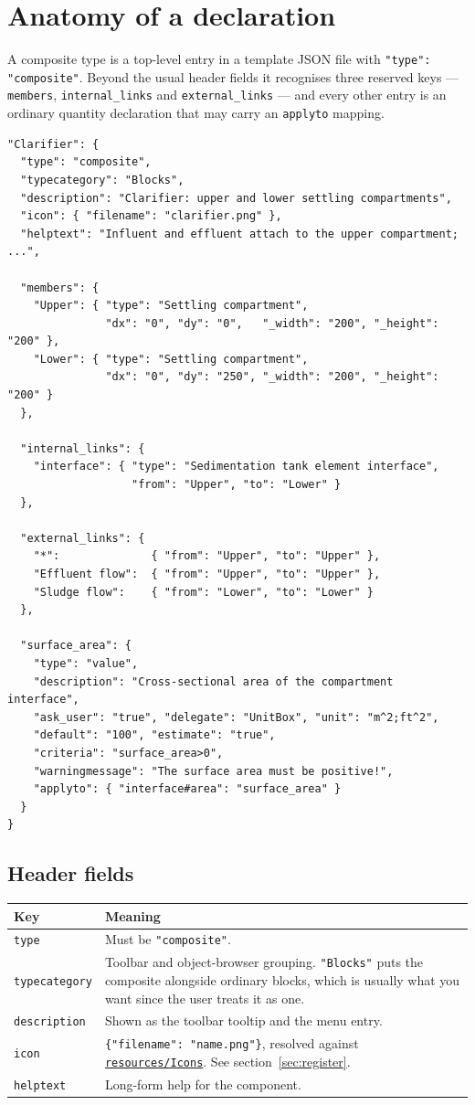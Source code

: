 \documentclass[11pt,a4paper]{article}
\newcommand{\code}[1]{\texttt{\small #1}}
\newcommand{\file}[1]{\texttt{\small #1}}
\newcommand{\ghtree}{https://github.com/ArashMassoudieh/OpenHydroQual/tree/master}
\newcommand{\exdir}[1]{\href{\ghtree/#1}{\file{#1}}}
\begin{document}
\section{Anatomy of a declaration}

A composite type is a top-level entry in a template JSON file with
\code{"type": "composite"}. Beyond the usual header fields it recognises three
reserved keys --- \code{members}, \code{internal\_links} and
\code{external\_links} --- and every other entry is an ordinary quantity
declaration that may carry an \code{applyto} mapping.

\begin{lstlisting}
"Clarifier": {
  "type": "composite",
  "typecategory": "Blocks",
  "description": "Clarifier: upper and lower settling compartments",
  "icon": { "filename": "clarifier.png" },
  "helptext": "Influent and effluent attach to the upper compartment; ...",

  "members": {
    "Upper": { "type": "Settling compartment",
               "dx": "0", "dy": "0",   "_width": "200", "_height": "200" },
    "Lower": { "type": "Settling compartment",
               "dx": "0", "dy": "250", "_width": "200", "_height": "200" }
  },

  "internal_links": {
    "interface": { "type": "Sedimentation tank element interface",
                   "from": "Upper", "to": "Lower" }
  },

  "external_links": {
    "*":              { "from": "Upper", "to": "Upper" },
    "Effluent flow":  { "from": "Upper", "to": "Upper" },
    "Sludge flow":    { "from": "Lower", "to": "Lower" }
  },

  "surface_area": {
    "type": "value",
    "description": "Cross-sectional area of the compartment interface",
    "ask_user": "true", "delegate": "UnitBox", "unit": "m^2;ft^2",
    "default": "100", "estimate": "true",
    "criteria": "surface_area>0",
    "warningmessage": "The surface area must be positive!",
    "applyto": { "interface#area": "surface_area" }
  }
}
\end{lstlisting}

\subsection{Header fields}

\begin{longtable}{@{}p{}p{}@{}}
\toprule
\textbf{Key} & \textbf{Meaning}\\
\midrule
\endhead
\code{type} & Must be \code{"composite"}.\\
\code{typecategory} & Toolbar and object-browser grouping. \code{"Blocks"} puts
the composite alongside ordinary blocks, which is usually what you want since
the user treats it as one.\\
\code{description} & Shown as the toolbar tooltip and the menu entry.\\
\code{icon} & \code{\{"filename": "name.png"\}}, resolved against
\exdir{resources/Icons}. See section~\ref{sec:register}.\\
\code{helptext} & Long-form help for the component.\\
\bottomrule
\end{longtable}
\end{document}
